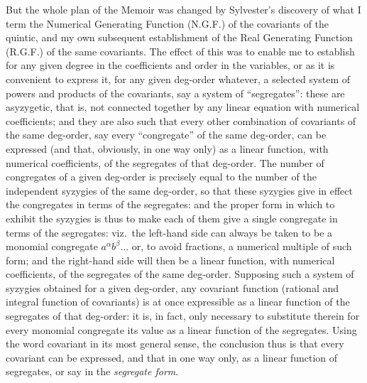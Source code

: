 \documentclass[12pt,a4paper]{article}
\begin{document}
But the whole plan of the Memoir was changed by Sylvester's discovery of what I term the Numerical Generating Function (N.G.F.) of the covariants of the quintic, and my own subsequent establishment of the Real Generating Function (R.G.F.) of the same covariants. The effect of this was to enable me to establish for any given degree in the coefficients and order in the variables, or as it is convenient to express it, for any given deg-order whatever, a selected system of powers and products of the covariants, say a system of ``segregates'': these are asyzygetic, that is, not connected together by any linear equation with numerical coefficients; and they are also such that every other combination of covariants of the same deg-order, say every ``congregate'' of the same deg-order, can be expressed (and that, obviously, in one way only) as a linear function, with numerical coefficients, of the segregates of that deg-order. The number of congregates of a given deg-order is precisely equal to the number of the independent syzygies of the same deg-order, so that these syzygies give in effect the congregates in terms of the segregates: and the proper form in which to exhibit the syzygies is thus to make each of them give a single congregate in terms of the segregates: viz.\ the left-hand side can always be taken to be a monomial congregate $a^\alpha b^\beta \ldots$ or, to avoid fractions, a numerical multiple of such form; and the right-hand side will then be a linear function, with numerical coefficients, of the segregates of the same deg-order. Supposing such a system of syzygies obtained for a given deg-order, any covariant function (rational and integral function of covariants) is at once expressible as a linear function of the segregates of that deg-order: it is, in fact, only necessary to substitute therein for every monomial congregate its value as a linear function of the segregates. Using the word covariant in its most general sense, the conclusion thus is that every covariant can be expressed, and that in one way only, as a linear function of segregates, or say in the \textit{segregate form}.
\end{document}
